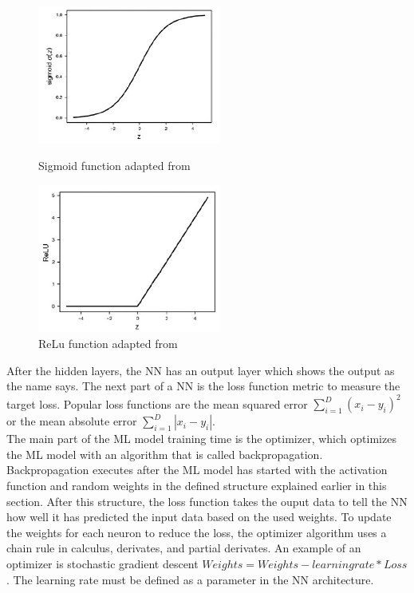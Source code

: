 \begin{figure}[ht!]
  \centering
  \begin{minipage}[b]{0.4\textwidth}
    \includegraphics[width=6cm]{pictures/sigmoid.jpg}
    \caption{Sigmoid function adapted from \cite{moolayil_2019}}
    \label{fig:sigmoid}
  \end{minipage}
  \hfill
  \begin{minipage}[b]{0.4\textwidth}
    \includegraphics[width=6cm]{pictures/relu.jpg}
    \caption{ReLu function adapted from \cite{moolayil_2019}}
    \label{fig:relu}
  \end{minipage}
\end{figure}

After the hidden layers, the NN has an output layer which shows the output as the name says. The next part of a NN is the loss function metric to measure the target loss. Popular loss functions \cite{DBLP:conf/cvpr/WanLC21} are the mean squared error $\sum_{i=1}^{D}(x_i-y_i)^2$ or the mean absolute error $\sum_{i=1}^{D}|x_i-y_i|$. \\
The main part of the ML model training time is the optimizer, which optimizes the ML model with an algorithm that is called backpropagation. Backpropagation executes after the ML model has started with the activation function and random weights in the defined structure explained earlier in this section. After this structure, the loss function takes the ouput data to tell the NN how well it has predicted the input data based on the used weights. To update the weights for each neuron to reduce the loss, the optimizer algorithm uses a chain rule in calculus, derivates, and partial derivates. An example of an optimizer is stochastic gradient descent $Weights = Weights - learning rate * Loss$. The learning rate must be defined as a parameter in the NN architecture.


